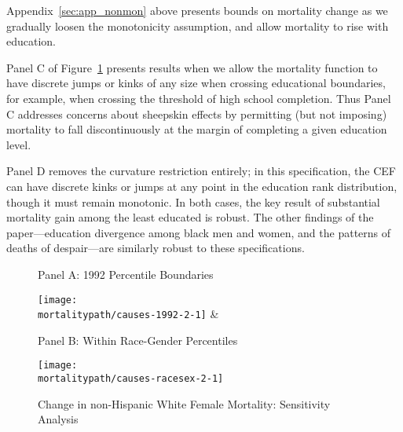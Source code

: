 Appendix~\ref{sec:app_nonmon} above presents bounds on mortality change as we gradually loosen the monotonicity assumption, and allow mortality to rise with education.

Panel C of Figure~\ref{fig:robust} presents results when we allow the
mortality function to have discrete jumps or kinks of any size when
crossing educational boundaries, for example, when crossing the
threshold of high school completion. Thus Panel C addresses concerns
about sheepskin effects by permitting (but not imposing) mortality to
fall discontinuously at the margin of completing a given education
level. 

Panel D removes the curvature restriction entirely; in this specification, the CEF can have discrete kinks or jumps at any point in the education rank distribution, though it must remain monotonic. In both cases, the key result of substantial mortality gain among the least educated is robust. The other findings of the paper---education divergence among black men and women, and the patterns of deaths of despair---are similarly robust to these specifications.

\begin{figure}[H]
  \caption{Change in non-Hispanic White Female Mortality: Sensitivity Analysis} \thispagestyle{empty}
  \label{fig:robust}

  \begin{center}
    \vspace{-.6cm} Panel A: 1992 Percentile Boundaries
  \end{center}
  \vspace{-1.4cm}
  \begin{center}
    \texttt{[image: \\mortalitypath/causes-1992-2-1]} &
  \end{center}

  \begin{center}
    \vspace{-.6cm} Panel B: Within Race-Gender Percentiles
  \end{center}
  \vspace{-1.4cm}
  \begin{center}
    \texttt{[image: \\mortalitypath/causes-racesex-2-1]} \\
  \end{center}
\end{figure}

